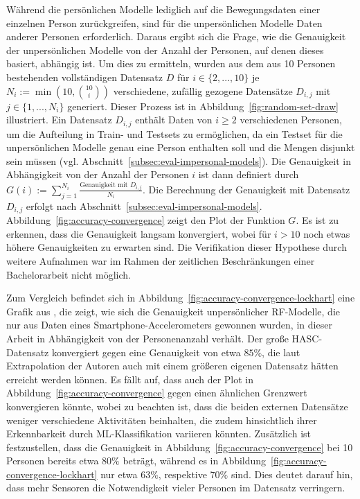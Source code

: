 Während die persönlichen Modelle lediglich auf die Bewegungsdaten einer einzelnen Person zurückgreifen, sind für die unpersönlichen Modelle Daten anderer Personen erforderlich. Daraus ergibt sich die Frage, wie die Genauigkeit der unpersönlichen Modelle von der Anzahl der Personen, auf denen dieses basiert, abhängig ist. Um dies zu ermitteln, wurden aus dem aus 10 Personen bestehenden vollständigen Datensatz $D$ für $i \in \{2, ..., 10\}$ je $N_i := \min(10, \binom{10}{i})$ verschiedene, zufällig gezogene Datensätze $D_{i,j}$ mit $j \in \{1, ..., N_i\}$ generiert. Dieser Prozess ist in Abbildung~\ref{fig:random-set-draw} illustriert. Ein Datensatz $D_{i,j}$ enthält Daten von $i \geq 2$ verschiedenen Personen, um die Aufteilung in Train- und Testsets zu ermöglichen, da ein Testset für die unpersönlichen Modelle genau eine Person enthalten soll und die Mengen disjunkt sein müssen (vgl. Abschnitt~\ref{subsec:eval-impersonal-models}). Die Genauigkeit in Abhängigkeit von der Anzahl der Personen $i$ ist dann definiert durch $G(i) := \sum_{j=1}^{N_i} \frac{\text{Genauigkeit mit } D_{i,j}}{N_i}$. Die Berechnung der Genauigkeit mit Datensatz $D_{i,j}$ erfolgt nach Abschnitt~\ref{subsec:eval-impersonal-models}.
Abbildung~\ref{fig:accuracy-convergence} zeigt den Plot der Funktion $G$. Es ist zu erkennen, dass die Genauigkeit langsam konvergiert, wobei für $i > 10$ noch etwas höhere Genauigkeiten zu erwarten sind. Die Verifikation dieser Hypothese durch weitere Aufnahmen war im Rahmen der zeitlichen Beschränkungen einer Bachelorarbeit nicht möglich.

Zum Vergleich befindet sich in Abbildung~\ref{fig:accuracy-convergence-lockhart} eine Grafik aus \cite{Lockhart2014}, die zeigt, wie sich die Genauigkeit unpersönlicher RF-Modelle, die nur aus Daten eines Smartphone-Accelerometers gewonnen wurden, in dieser Arbeit in Abhängigkeit von der Personenanzahl verhält. Der große HASC-Datensatz konvergiert gegen eine Genauigkeit von etwa $85 \%$, die laut Extrapolation der Autoren auch mit einem größeren eigenen Datensatz hätten erreicht werden können. Es fällt auf, dass auch der Plot in Abbildung~\ref{fig:accuracy-convergence} gegen einen ähnlichen Grenzwert konvergieren könnte, wobei zu beachten ist, dass die beiden externen Datensätze weniger verschiedene Aktivitäten beinhalten, die zudem hinsichtlich ihrer Erkennbarkeit durch ML-Klassifikation variieren könnten. Zusätzlich ist festzustellen, dass die Genauigkeit in Abbildung~\ref{fig:accuracy-convergence} bei 10 Personen bereits etwa $80 \%$ beträgt, während es in Abbildung~\ref{fig:accuracy-convergence-lockhart} nur etwa $63 \%$, respektive $70 \%$ sind. Dies deutet darauf hin, dass mehr Sensoren die Notwendigkeit vieler Personen im Datensatz verringern.

